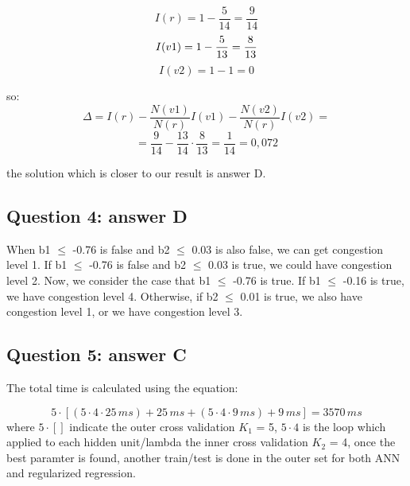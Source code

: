 \documentclass[10pt]{article}
\numberwithin{equation}{section}
\numberwithin{figure}{section}
\numberwithin{table}{section}
\begin{document}
\begin{equation*}
I(r) = 1 - \frac{5}{14} = \frac{9}{14}
\end{equation*}
\begin{equation*}
    I(v1) = 1 - \frac{5}{13} = \frac{8}{13}\\
\end{equation*}
\begin{equation*}
      I(v2) = 1-1 = 0
\end{equation*}

so:
\vspace{10pt}
\begin{equation*}
    \Delta = I(r) - \frac{N(v1)}{N(r)}I(v1) - \frac{N(v2)}{N(r)}I(v2) =
\end{equation*}
\begin{equation*}
    = \frac{9}{14} - \frac{13}{14}\cdot\frac{8}{13} = \frac{1}{14 }= 0,072
\end{equation*}

the solution which is closer to our result is answer D.


\vspace{5mm}

\subsection*{Question 4: answer D}
When b1 $\leq$ -0.76 is false and b2 $\leq$ 0.03 is also false, we can get congestion level 1. If b1 $\leq$ -0.76 is false and b2 $\leq$ 0.03 is true, we could have congestion level 2. Now, we consider the case that b1 $\leq$ -0.76 is true. If b1 $\leq$ -0.16 is true, we have congestion level 4. Otherwise, if b2 $\leq$ 0.01 is true, we also have congestion level 1, or we have congestion level 3. 


\subsection*{Question 5: answer C}

The total time is calculated using the equation:

\begin{equation*}
    5\cdot[(5\cdot4\cdot25 \hspace{2pt} ms) + 25\hspace{2pt} ms + (5\cdot4\cdot9 \hspace{2pt} ms) + 9 \hspace{2pt} ms] = 3570 \hspace{2pt} ms 
\end{equation*}
where $5\cdot [ ]$ indicate the outer cross validation $K_1$ = 5, $5\cdot4$ is the loop which applied to each hidden unit/lambda the inner cross validation $K_2$ = 4, once the best paramter is found, another train/test is done in the outer set for both ANN and regularized regression.
\end{document}

